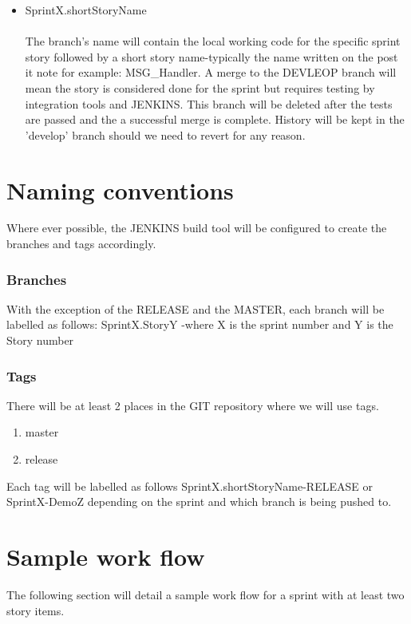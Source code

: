 \documentclass[11pt]{report}
\begin{document}
\begin{itemize}
\item SprintX.shortStoryName\\ \\
The branch's name will contain the local working code for the specific sprint story followed by a short story name-typically the name written on the post it note for example: MSG\_Handler. A merge to the DEVLEOP branch will mean the story is considered done for the sprint but requires testing by integration tools and JENKINS. This branch will be deleted after the tests are passed and the a successful merge is complete. History will be kept in the 'develop' branch should we need to revert for any reason. 
\end{itemize}


\chapter{Naming conventions}
Where ever possible, the JENKINS build tool will be configured to create the branches and tags accordingly. 
\subsection{Branches}
With the exception of the RELEASE and the MASTER, each branch will be labelled as follows: SprintX.StoryY -where X is the sprint number and Y is the Story number
\subsection{Tags}
There will be at least 2 places in the GIT repository where we will use tags.
\begin{enumerate}
\item master
\item release
\end{enumerate}
Each tag will be labelled as follows SprintX.shortStoryName-RELEASE or SprintX-DemoZ depending on the sprint and which branch is being pushed to.


\chapter{Sample work flow}

The following section will detail a sample work flow for a sprint with at least two story items. 
\end{document}
